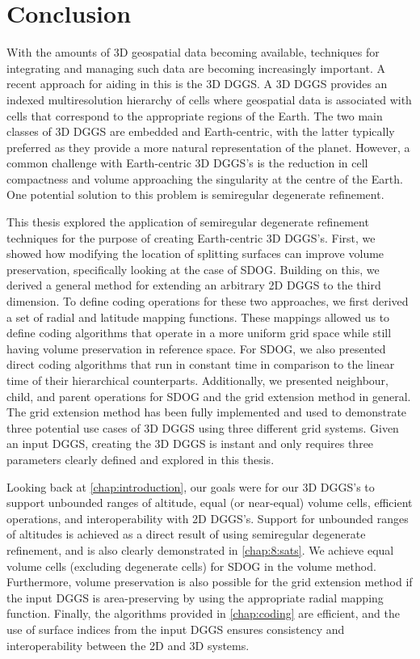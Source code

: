 \chapter{Conclusion} \label{chap:conclusion}
With the amounts of 3D geospatial data becoming available, techniques for integrating and managing such data are becoming increasingly important.
A recent approach for aiding in this is the 3D DGGS.
A 3D DGGS provides an indexed multiresolution hierarchy of cells where geospatial data is associated with cells that correspond to the appropriate regions of the Earth.
The two main classes of 3D DGGS are embedded and Earth-centric, with the latter typically preferred as they provide a more natural representation of the planet.
However, a common challenge with Earth-centric 3D DGGS's is the reduction in cell compactness and volume approaching the singularity at the centre of the Earth.
One potential solution to this problem is semiregular degenerate refinement.


This thesis explored the application of semiregular degenerate refinement techniques for the purpose of creating Earth-centric 3D DGGS's.
First, we showed how modifying the location of splitting surfaces can improve volume preservation, specifically looking at the case of SDOG.
Building on this, we derived a general method for extending an arbitrary 2D DGGS to the third dimension.
To define coding operations for these two approaches, we first derived a set of radial and latitude mapping functions.
These mappings allowed us to define coding algorithms that operate in a more uniform grid space while still having volume preservation in reference space.
For SDOG, we also presented direct coding algorithms that run in constant time in comparison to the linear time of their hierarchical counterparts.
Additionally, we presented neighbour, child, and parent operations for SDOG and the grid extension method in general.
The grid extension method has been fully implemented and used to demonstrate three potential use cases of 3D DGGS using three different grid systems.
Given an input DGGS, creating the 3D DGGS is instant and only requires three parameters clearly defined and explored in this thesis.


Looking back at \cref{chap:introduction}, our goals were for our 3D DGGS's to support unbounded ranges of altitude, equal (or near-equal) volume cells, efficient operations, and interoperability with 2D DGGS's.
Support for unbounded ranges of altitudes is achieved as a direct result of using semiregular degenerate refinement, and is also clearly demonstrated in \cref{chap:8:sats}.
We achieve equal volume cells (excluding degenerate cells) for SDOG in the volume method.
Furthermore, volume preservation is also possible for the grid extension method if the input DGGS is area-preserving by using the appropriate radial mapping function.
Finally, the algorithms provided in \cref{chap:coding} are efficient, and the use of surface indices from the input DGGS ensures consistency and interoperability between the 2D and 3D systems.


